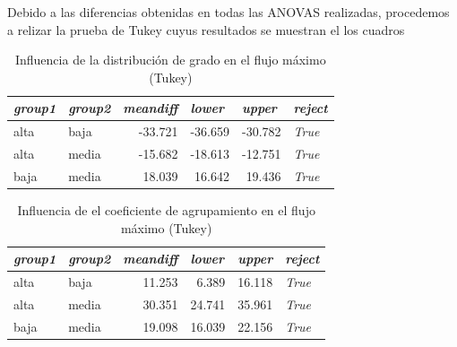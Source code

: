\documentclass{article}
\begin{document}
Debido a las diferencias obtenidas en todas las ANOVAS realizadas, procedemos a relizar la prueba de Tukey cuyus resultados se muestran el los cuadros 

\begin{table}[htbp]
  \centering
  \caption{Influencia de la distribución de grado en el flujo máximo (Tukey)}
    \begin{tabular}{llrrrl}
    \toprule
    \textit{\textbf{group1}} & \textit{\textbf{group2}} & \multicolumn{1}{l}{\textit{\textbf{meandiff}}} & \multicolumn{1}{l}{\textit{\textbf{lower}}} & \multicolumn{1}{l}{\textit{\textbf{upper}}} & \textit{\textbf{reject}} \\
    \midrule
    alta  & baja  & -33.721 & -36.659 & -30.782 & \textit{True} \\
    alta  & media & -15.682 & -18.613 & -12.751 & \textit{True} \\
    baja  & media & 18.039 & 16.642 & 19.436 & \textit{True} \\
    \bottomrule
    \end{tabular}%
  \label{tab:t27}%
\end{table}%

\begin{table}[htbp]
  \centering
  \caption{Influencia de el coeficiente de agrupamiento en el flujo máximo (Tukey)}
    \begin{tabular}{llrrrl}
    \toprule
    \textit{\textbf{group1}} & \textit{\textbf{group2}} & \multicolumn{1}{l}{\textit{\textbf{meandiff}}} & \multicolumn{1}{l}{\textit{\textbf{lower}}} & \multicolumn{1}{l}{\textit{\textbf{upper}}} & \textit{\textbf{reject}} \\
    \midrule
    alta  & baja  & 11.253 & 6.389 & 16.118 & \textit{True} \\
    alta  & media & 30.351 & 24.741 & 35.961 & \textit{True} \\
    baja  & media & 19.098 & 16.039 & 22.156 & \textit{True} \\
    \bottomrule
    \end{tabular}%
  \label{tab:t28}%
\end{table}%
\end{document}

